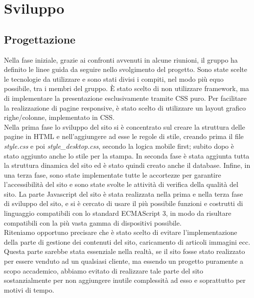 \section{Sviluppo}

\subsection{Progettazione}
Nella fase iniziale, grazie ai confronti avvenuti in alcune riunioni, il gruppo ha definito le linee guida da seguire nello svolgimento del progetto. Sono state scelte le tecnologie da utilizzare e sono stati divisi i compiti, nel modo più equo possibile, tra i membri del gruppo. È stato scelto di non utilizzare framework, ma di implementare la presentazione esclusivamente tramite CSS puro. Per facilitare la realizzazione di pagine responsive, è stato scelto di utilizzare un layout grafico righe/colonne, implementato in CSS. 
\\Nella prima fase lo sviluppo del sito si è concentrato sul creare la struttura delle pagine in HTML e nell'aggiungere ad esse le regole di stile, creando prima il file \textit{style.css} e poi \textit{style\_desktop.css}, secondo la logica mobile first; subito dopo è stato aggiunto anche lo stile per la stampa. In seconda fase è stata aggiunta tutta la struttura dinamica del sito ed è stato quindi creato anche il database. Infine, in una terza fase, sono state implementate tutte le accortezze per garantire l'accessibilità del sito e sono state svolte le attività di verifica della qualità del sito. La parte Javascript del sito è stata realizzata nella prima e nella terza fase di sviluppo del sito, e si è cercato di usare il più possibile funzioni e costrutti di linguaggio compatibili con lo standard ECMAScript 3, in modo da risultare compatibili con la più vasta gamma di dispositivi possibile. 
\\Riteniamo opportuno precisare che è stato scelto di evitare l'implementazione della parte di gestione dei contenuti del sito, caricamento di articoli immagini ecc. Questa parte sarebbe stata essenziale nella realtà, se il sito fosse stato realizzato per essere venduto ad un qualsiasi cliente, ma essendo un progetto puramente a scopo accademico, abbiamo evitato di realizzare tale parte del sito sostanzialmente per non aggiungere inutile complessità ad esso e soprattutto per motivi di tempo.

